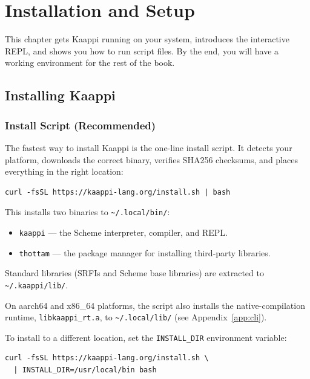 \chapter{Installation and Setup}
\label{ch:installation}

This chapter gets Kaappi running on your system, introduces the interactive REPL, and shows you how to run script files. By the end, you will have a working environment for the rest of the book.

\section{Installing Kaappi}

\subsection{Install Script (Recommended)}

The fastest way to install Kaappi is the one-line install script. It detects your platform, downloads the correct binary, verifies SHA256 checksums, and places everything in the right location:

\begin{Verbatim}[fontsize=\small]
curl -fsSL https://kaappi-lang.org/install.sh | bash
\end{Verbatim}

This installs two binaries to \texttt{\textasciitilde/.local/bin/}:

\begin{itemize}
    \item \texttt{kaappi} --- the Scheme interpreter, compiler, and REPL.
    \item \texttt{thottam} --- the package manager for installing third-party libraries.
\end{itemize}

Standard libraries (SRFIs and Scheme base libraries) are extracted to \texttt{\textasciitilde/.kaappi/lib/}.

On aarch64 and x86\_64 platforms, the script also installs the native-compilation runtime, \texttt{libkaappi\_rt.a}, to \texttt{\textasciitilde/.local/lib/} (see Appendix~\ref{app:cli}).

To install to a different location, set the \texttt{INSTALL\_DIR} environment variable:

\begin{Verbatim}[fontsize=\small]
curl -fsSL https://kaappi-lang.org/install.sh \
  | INSTALL_DIR=/usr/local/bin bash
\end{Verbatim}

